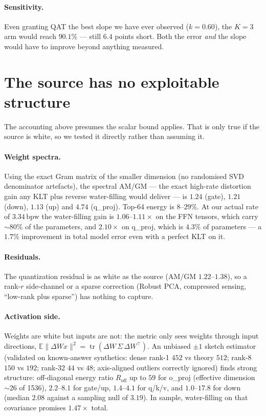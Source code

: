 \documentclass[11pt,a4paper]{article}
\newcommand{\bpw}{\,\mathrm{bpw}}
\begin{document}
\paragraph{Sensitivity.} Even granting QAT the best slope we have ever observed ($k=0.60$), the
$K=3$ arm would reach $90.1\%$ --- still $6.4$ points short. Both the error \emph{and} the slope
would have to improve beyond anything measured.

\section{The source has no exploitable structure}
\label{sec:white}

The accounting above presumes the scalar bound applies. That is only true if the source is white,
so we tested it directly rather than assuming it.

\paragraph{Weight spectra.} Using the exact Gram matrix of the smaller dimension (no randomised
SVD denominator artefacts), the spectral AM/GM --- the exact high-rate distortion gain any
KLT plus reverse water-filling would deliver --- is $1.24$ (gate), $1.21$ (down), $1.13$ (up) and
$4.74$ (q\_proj). Top-64 energy is $8$--$29\%$. At our actual rate of $3.34\bpw$ the water-filling
gain is $1.06$--$1.11\times$ on the FFN tensors, which carry $\sim$80\% of the parameters, and
$2.10\times$ on q\_proj, which is $4.3\%$ of parameters --- a $1.7\%$ improvement in total model
error even with a perfect KLT on it.

\paragraph{Residuals.} The quantization residual is as white as the source (AM/GM
$1.22$--$1.38$), so a rank-$r$ side-channel or a sparse correction (Robust PCA, compressed
sensing, ``low-rank plus sparse'') has nothing to capture.

\paragraph{Activation side.} Weights are white but inputs are not: the metric only sees weights
through input directions, $\mathbb{E}\|\Delta W x\|^2=\operatorname{tr}(\Delta W\,\Sigma\,\Delta W^\top)$.
An unbiased $\pm1$ sketch estimator (validated on known-answer synthetics: dense rank-1 $452$ vs
theory $512$; rank-8 $150$ vs $192$; rank-32 $44$ vs $48$; axis-aligned outliers correctly
ignored) finds strong structure: off-diagonal energy ratio $R_{\mathrm{off}}$ up to $59$ for
o\_proj (effective dimension $\sim$26 of 1536), $2.2$--$8.1$ for gate/up, $1.4$--$4.1$ for q/k/v, and
$1.0$--$17.8$ for down (median $2.08$ against a sampling null of $3.19$). In sample, water-filling on that
covariance promises $1.47\times$ total.
\end{document}
